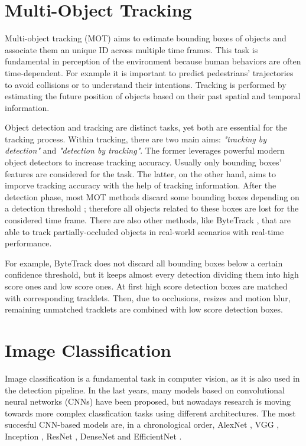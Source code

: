 \section {Multi-Object Tracking}
Multi-object tracking (MOT) aims to estimate bounding boxes of objects and 
associate them an unique ID across multiple time frames. This task is 
fundamental in perception of the environment because human behaviors are often 
time-dependent. For example it is important to predict pedestrians' trajectories 
to avoid collisions or to understand their intentions. Tracking is performed by 
estimating the future position of objects based on their past spatial and 
temporal information.

Object detection and tracking are distinct tasks, yet both are essential for 
the tracking process. Within tracking, there are two main aims: 
\textit{"tracking by detection"} and \textit{"detection by tracking"}. 
The former leverages powerful modern object detectors to increase tracking 
accuracy. Usually only bounding boxes' features are considered for the task.
The latter, on the other hand, aims to imporve tracking accuracy with the help 
of tracking information. After the detection phase, most MOT methods discard 
some bounding boxes depending on a detection threshold 
\cite{retinatrack,transtrack}; 
therefore all objects related to these boxes are lost for the considered time 
frame. There are also other methods, like ByteTrack \cite{bytetrack}, that are 
able to track partially-occluded objects in real-world scenarios with 
real-time performance. 

For example, ByteTrack does not discard all bounding 
boxes below a certain confidence threshold, but it keeps almost every detection 
dividing them into high score ones and low score ones. At first high score 
detection boxes are matched with corresponding tracklets. Then, due to 
occlusions, resizes and motion blur, remaining unmatched tracklets are 
combined with low score detection boxes. 

\section{Image Classification}
Image classification is a fundamental task in computer vision, as it is also 
used in the detection pipeline. In the last years, many models based on 
convolutional neural networks (CNNs) have been proposed, but nowadays research 
is moving towards more complex classfication tasks using different 
architectures.
The most succesful CNN-based models are, in a chronological order, 
AlexNet \cite{alexnet}, 
VGG \cite{vggnet}, Inception \cite{inception}, ResNet \cite{resnet}, 
DenseNet \cite{densenet} and 
EfficientNet \cite{efficientnet}.

